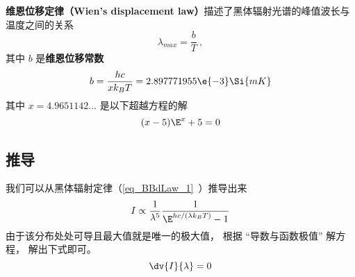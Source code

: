 

\textbf{维恩位移定律（Wien's displacement law）}描述了黑体辐射光谱的峰值波长与温度之间的关系
\begin{equation}
\lambda_{max} = \frac{b}{T}~,
\end{equation}
其中 $b$ 是\textbf{维恩位移常数}
\begin{equation}
b = \frac{hc}{xk_B T} = 2.897771955\e{-3} \Si{mK}
\end{equation}
其中 $x = 4.9651142\dots$ 是以下超越方程的解
\begin{equation}
(x-5)\E^x + 5 = 0
\end{equation}

\subsection{推导}

我们可以从黑体辐射定律（\autoref{eq_BBdLaw_1}~）推导出来
\begin{equation}
I \propto \frac{1}{\lambda^5} \frac{1}{\E^{hc/(\lambda k_B T)} - 1}
\end{equation}
由于该分布处处可导且最大值就是唯一的极大值， 根据 “导数与函数极值” 解方程， 解出下式即可。
\begin{equation}
\dv{I}{\lambda} = 0
\end{equation}
